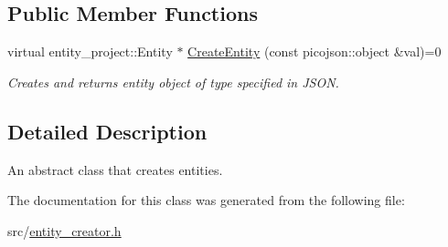 \subsection*{Public Member Functions}
\begin{DoxyCompactItemize}
\item 
\mbox{\label{classcsci3081_1_1EntityCreator_a68aab88afd1c9492be723fb852818e7f}} 
virtual entity\+\_\+project\+::\+Entity $\ast$ \hyperlink{classcsci3081_1_1EntityCreator_a68aab88afd1c9492be723fb852818e7f}{Create\+Entity} (const picojson\+::object \&val)=0
\begin{DoxyCompactList}\small\item\em Creates and returns entity object of type specified in J\+S\+ON. \end{DoxyCompactList}\end{DoxyCompactItemize}


\subsection{Detailed Description}
An abstract class that creates entities. 

The documentation for this class was generated from the following file\+:\begin{DoxyCompactItemize}
\item 
src/\hyperlink{entity__creator_8h}{entity\+\_\+creator.\+h}\end{DoxyCompactItemize}
